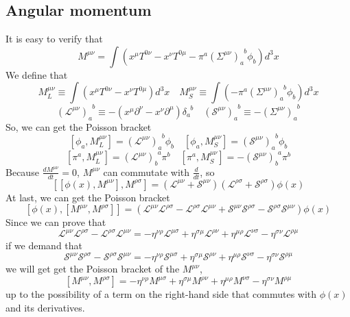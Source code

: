 \subsection{Angular momentum}

It is easy to verify that
\[M^{\mu \nu} = \int (x^{\mu}T^{0\nu}-x^{\nu}T^{0\mu}-\pi^a(\Sigma^{\mu \nu})_{a}^{\phantom{a}b}\phi_b) d^3 x\]
We define that
\[M_{L}^{\mu \nu} \equiv \int (x^{\mu}T^{0\nu}-x^{\nu}T^{0\mu}) d^3 x \quad M_S^{\mu \nu} \equiv \int (-\pi^a(\Sigma^{\mu \nu})_{a}^{\phantom{a}b}\phi_b) d^3 x\]
\[(\mathcal{L}^{\mu \nu})_a^{\phantom{a}b} \equiv -(x^{\mu}\partial^{\nu}-x^{\nu}\partial^{\mu})\delta_a^{\phantom{a}b} \quad (\mathcal{S}^{\mu \nu})_a^{\phantom{a}b} \equiv -(\Sigma^{\mu \nu})_a^{\phantom{a}b}\]
So, we can get the Poisson bracket
\[[\phi_a,M_L^{\mu \nu}] = (\mathcal{L}^{\mu \nu})_a^{\phantom{a}b} \phi_b \quad [\phi_a,M_S^{\mu \nu}] = (\mathcal{S}^{\mu \nu})_a^{\phantom{a}b} \phi_b\]
\[[\pi^a,M_L^{\mu \nu}] = (\mathcal{L}^{\mu \nu})_b^{\phantom{b}a}\pi^{b}  \quad [\pi^a,M_S^{\mu \nu}] = - (\mathcal{S}^{\mu \nu})_b^{\phantom{b}a} \pi^b \]
Because $\frac{d M^{\mu \nu}}{dt} = 0$, $M^{\mu \nu}$ can commutate with $\frac{d}{dt}$, so
\[[[\phi(x),M^{\mu \nu}],M^{\rho \sigma}] = (\mathcal{L}^{\mu \nu}+\mathcal{S}^{\mu \nu})(\mathcal{L}^{\rho \sigma}+\mathcal{S}^{\rho \sigma})\phi(x)\]
At last, we can get the Poisson bracket 
\[[\phi(x),[M^{\mu \nu},M^{\rho \sigma}]] = (\mathcal{L}^{\mu \nu}\mathcal{L}^{\rho \sigma}-\mathcal{L}^{\rho \sigma}\mathcal{L}^{\mu \nu} + \mathcal{S}^{\mu \nu}\mathcal{S}^{\rho \sigma}-\mathcal{S}^{\rho \sigma}\mathcal{S}^{\mu \nu})\phi(x)\]
Since we can prove that
\[\mathcal{L}^{\mu \nu}\mathcal{L}^{\rho \sigma}-\mathcal{L}^{\rho \sigma}\mathcal{L}^{\mu \nu} = -\eta^{\nu \rho}\mathcal{L}^{\mu \sigma} + \eta^{\sigma \mu}\mathcal{L}^{\rho \nu} + \eta^{\mu \rho}\mathcal{L}^{\nu \sigma} - \eta^{\sigma \nu}\mathcal{L}^{\rho \mu}\]
if we demand that
\[\mathcal{S}^{\mu \nu}\mathcal{S}^{\rho \sigma}-\mathcal{S}^{\rho \sigma}\mathcal{S}^{\mu \nu} = -\eta^{\nu \rho}\mathcal{S}^{\mu \sigma} + \eta^{\sigma \mu}\mathcal{S}^{\rho \nu} + \eta^{\mu \rho}\mathcal{S}^{\nu \sigma} - \eta^{\sigma \nu}\mathcal{S}^{\rho \mu}\]
we will get get the Poisson bracket of the $M^{\mu \nu}$,
\[[M^{\mu \nu},M^{\rho \sigma}] = -\eta^{\nu \rho}M^{\mu \sigma} + \eta^{\sigma \mu}M^{\rho \nu} + \eta^{\mu \rho}M^{\nu \sigma} - \eta^{\sigma \nu}M^{\rho \mu}\]
up to the possibility of a term on the right-hand side that commutes with $\phi(x)$ and its derivatives.\\ \\
